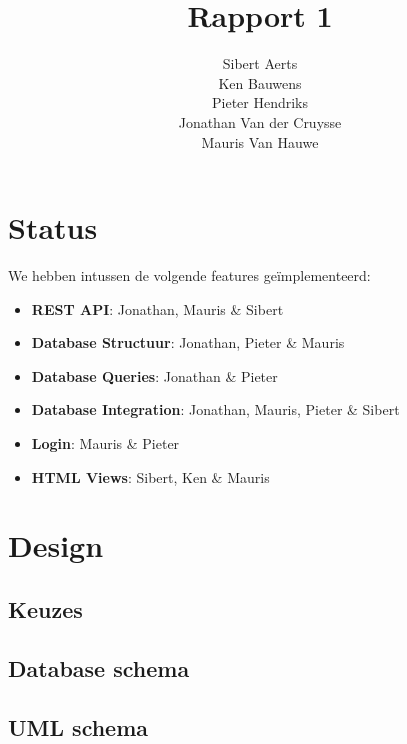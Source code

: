 \documentclass[12pt,a4paper]{article}
\begin{document}
\title{Rapport 1}
\author{Sibert Aerts \\ Ken Bauwens \\ Pieter Hendriks \\ Jonathan Van der Cruysse \\ Mauris Van Hauwe}
\maketitle

\newcommand{\code}[1]{\texttt{#1}}

\section{Status}

We hebben intussen de volgende features ge\"implementeerd:

\begin{itemize}

\item \textbf{REST API}: Jonathan, Mauris \& Sibert

\item \textbf{Database Structuur}: Jonathan, Pieter \& Mauris

\item \textbf{Database Queries}: Jonathan \& Pieter

\item \textbf{Database Integration}: Jonathan, Mauris, Pieter \& Sibert

\item \textbf{Login}: Mauris \& Pieter

\item \textbf{HTML Views}: Sibert, Ken \& Mauris

\end{itemize}

\section{Design}

\subsection{Keuzes}

\subsection{Database schema}

\subsection{UML schema}
\end{document}
